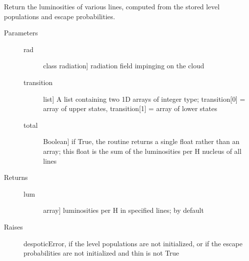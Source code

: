 \documentclass[letterpaper,10pt,english]{sphinxmanual}
\begin{document}
\begin{fulllineitems}
\begin{fulllineitems}
\begin{description}
\begin{description}
\end{description}

\end{description}

\end{fulllineitems}


\begin{fulllineitems}
\label{fulldoc:despotic.emitter.luminosityPerH}
Return the luminosities of various lines, computed from the
stored level populations and escape probabilities.
\begin{description}
\item[{Parameters}] \leavevmode\begin{description}
\item[{rad}] \leavevmode{[}class radiation{]}
radiation field impinging on the cloud

\item[{transition}] \leavevmode{[}list{]}
A list containing two 1D arrays of integer type;
transition{[}0{]} = array of upper states, transition{[}1{]} =
array of lower states

\item[{total}] \leavevmode{[}Boolean{]}
if True, the routine returns a single float rather than an
array; this float is the sum of the luminosities per H
nucleus of all lines

\end{description}

\item[{Returns}] \leavevmode\begin{description}
\item[{lum}] \leavevmode{[}array{]}
luminosities per H in specified lines; by default

\end{description}

\item[{Raises}] \leavevmode
despoticError, if the level populations are not initialized,
or if the escape probabilities are not initialized and thin is
not True

\end{description}

\end{fulllineitems}



\end{fulllineitems}
\end{document}
